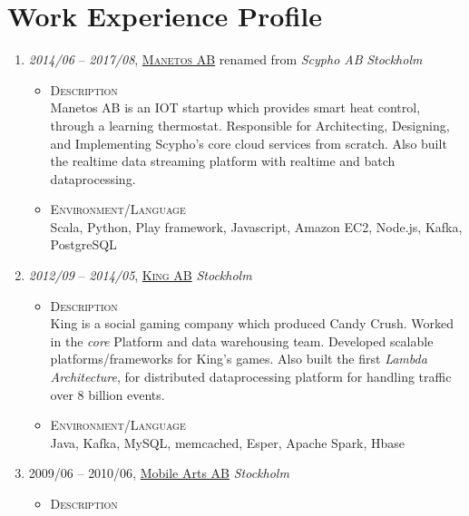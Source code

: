 \documentclass[a4paper,10pt]{article}
\begin{document}
  \section{Work Experience Profile}
\begin{enumerate}  
\item \emph{2014/06} – \emph{2017/08}, \textsc{\href{www.manetos.com}{Manetos AB}} renamed from \emph {Scypho AB} \emph {Stockholm} \\

  \begin{itemize}
    \item \textsc{Description} \\
      Manetos AB is an IOT startup which provides smart heat control, through a learning thermostat. Responsible for Architecting, Designing, and Implementing Scypho's core cloud services from scratch.
      Also built the realtime data streaming platform with realtime and batch dataprocessing.
   
  \item \textsc{Environment/Language} \\
    Scala, Python, Play framework, Javascript, Amazon EC2, Node.js, Kafka, PostgreSQL

 \end{itemize}
   
\item \emph{2012/09} – \emph{2014/05}, \textsc{\href{www.king.com}{King AB}} \emph{Stockholm} \\
  \begin{itemize}
    \item \textsc{Description} \\
  
      King is a social gaming company which produced Candy Crush. Worked in the \emph{core} Platform and data warehousing team. Developed scalable platforms/frameworks for King's games.
      Also built the first \emph {Lambda Architecture}, for distributed dataprocessing platform for handling traffic over 8 billion events.

     \item \textsc {Environment/Language} \\
       Java, Kafka, MySQL, memcached, Esper, Apache Spark, Hbase

   \end{itemize}
  
\item \textsc{2009/06} – \textsc{2010/06}, \href{www.mobilearts.com}{Mobile Arts AB} \emph {Stockholm} \\
  \begin{itemize}
    \item \textsc{Description} \\
  

\end{itemize}
\end{enumerate}
\end{document}
